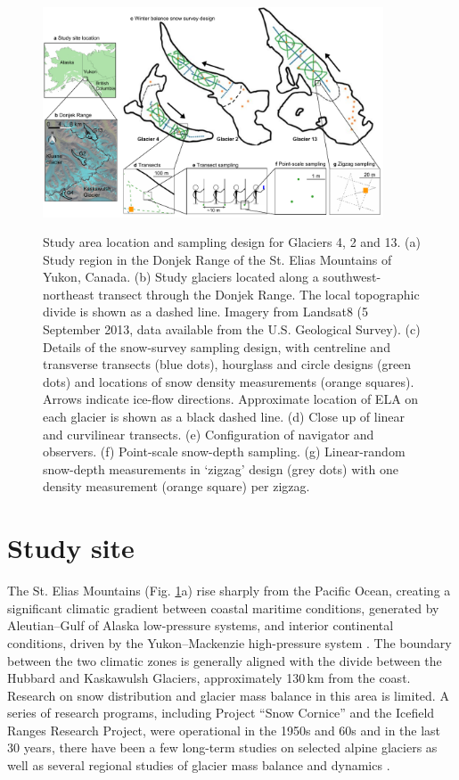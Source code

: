 \documentclass[review,oneside, letterpaper]{igs}
\begin{document}
\begin{figure}
	\centering
	\includegraphics[width =0.9\textwidth]{Sampling.pdf}\\
	\caption{Study area location and sampling design for Glaciers 4, 2 and 13. (a) Study region in the Donjek Range of the St. Elias Mountains of Yukon, Canada. (b) Study glaciers located along a southwest-northeast transect through the Donjek Range. The local topographic divide is shown as a dashed line. Imagery from Landsat8 (5 September 2013, data available from the U.S. Geological Survey). (c) Details of the snow-survey sampling design, with centreline and transverse transects (blue dots), hourglass and circle designs (green dots) and locations of snow density measurements (orange squares). Arrows indicate ice-flow directions. Approximate location of ELA on each glacier is shown as a black dashed line. (d) Close up of linear and curvilinear transects. (e) Configuration of navigator and observers. (f) Point-scale snow-depth sampling. (g) Linear-random snow-depth measurements in `zigzag' design (grey dots) with one density measurement (orange square) per zigzag.}
	\label{fig:Sampling}
\end{figure}

\section{Study site}

The St. Elias Mountains (Fig. \ref{fig:Sampling}a) rise sharply from the Pacific Ocean, creating a significant climatic gradient between coastal maritime conditions, generated by Aleutian--Gulf of Alaska low-pressure systems, and interior continental conditions, driven by the Yukon--Mackenzie high-pressure system \citep{Taylor1969}. The boundary between the two climatic zones is generally aligned with the divide between the Hubbard and Kaskawulsh Glaciers, approximately 130\,km from the coast. Research on snow distribution and glacier mass balance in this area is limited. A series of research programs, including Project ``Snow Cornice''  and the Icefield Ranges Research Project, were operational in the 1950s and 60s \citep{Wood1948, Danby2003} and in the last 30 years, there have been a few long-term studies on selected alpine glaciers \citep[e.g.][]{Clarke2014} as well as several regional studies of glacier mass balance and dynamics \citep[e.g.][]{Arendt2008, Burgess2013,Waechter2015}.
\end{document}
